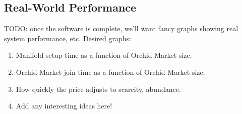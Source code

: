 \subsection{Real-World Performance}

TODO: once the software is complete, we'll want fancy graphs showing
real system performance, etc. Desired graphs:

\begin{enumerate}
\item Manifold setup time as a function of Orchid Market size.
\item Orchid Market join time as a function of Orchid Market size.
\item How quickly the price adjusts to scarcity, abundance.
\item Add any interesting ideas here!
\end{enumerate}

